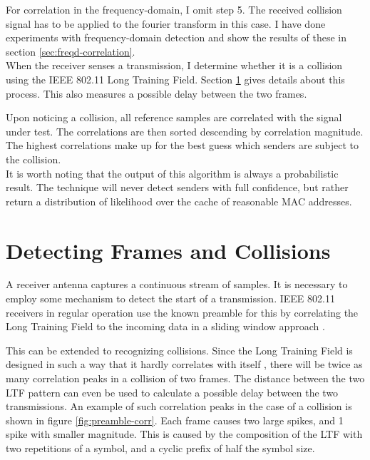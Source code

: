 For correlation in the frequency-domain, I omit step 5. The received collision signal has to be applied to the fourier transform in this case. I have done experiments with frequency-domain detection and show the results of these in section \ref{sec:freqd-correlation}.\\

When the receiver senses a transmission, I determine whether it is a collision using the IEEE 802.11 Long Training Field. Section \ref{sec:preamble-corr} gives details about this process. This also measures a possible delay between the two frames.

Upon noticing a collision, all reference samples are correlated with the signal under test. The correlations are then sorted descending by correlation magnitude. The highest correlations make up for the best guess which senders are subject to the collision.\\

It is worth noting that the output of this algorithm is always a probabilistic result. The technique will never detect senders with full confidence, but rather return a distribution of likelihood over the cache of reasonable MAC addresses.



\section{Detecting Frames and Collisions}\label{sec:preamble-corr}

A receiver antenna captures a continuous stream of samples. It is necessary to employ some mechanism to detect the start of a transmission. IEEE 802.11 receivers in regular operation use the known preamble for this by correlating the Long Training Field to the incoming data in a sliding window approach \cite{NEEDED}.

This can be extended to recognizing collisions. Since the Long Training Field is designed in such a way that it hardly correlates with itself \cite{NEEDED}, there will be twice as many correlation peaks in a collision of two frames. The distance between the two LTF pattern can even be used to calculate a possible delay between the two transmissions. An example of such correlation peaks in the case of a collision is shown in figure \ref{fig:preamble-corr}. Each frame causes two large spikes, and 1 spike with smaller magnitude. This is caused by the composition of the LTF with two repetitions of a symbol, and a cyclic prefix of half the symbol size.\\

